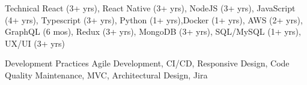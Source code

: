 \begin{cvskills}

  \cvskill
  {Technical} %
  {React (3+ yrs), React Native (3+ yrs), NodeJS (3+ yrs), JavaScript (4+ yrs), Typescript (3+ yrs), Python (1+ yrs),\break Docker (1+ yrs), AWS (2+ yrs), GraphQL (6 mos), Redux (3+ yrs), MongoDB (3+ yrs), SQL/MySQL (1+ yrs), UX/UI (3+ yrs)} %


  \cvskill
  {Development Practices} %
  {Agile Development, CI/CD, Responsive Design, Code Quality Maintenance, MVC, Architectural Design, Jira} %

\end{cvskills}

